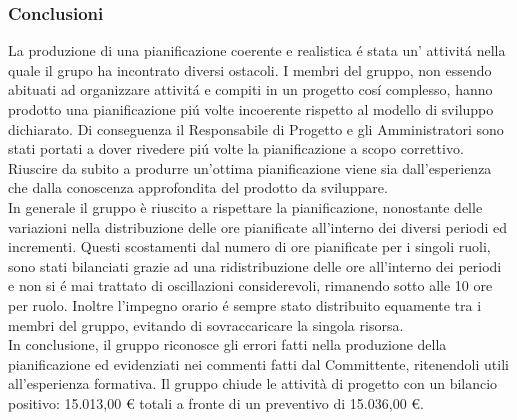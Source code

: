 \subsubsection{Conclusioni}
La produzione di una pianificazione coerente e realistica é stata un' attivitá nella quale il grupo ha incontrato diversi ostacoli. I membri del gruppo, non essendo abituati ad organizzare attivitá e compiti in un progetto cosí complesso, hanno prodotto una pianificazione piú volte incoerente rispetto al modello di sviluppo dichiarato. Di conseguenza il Responsabile di Progetto e gli Amministratori sono stati portati a dover rivedere piú volte la pianificazione a scopo correttivo. Riuscire da subito a produrre un'ottima pianificazione viene sia dall'esperienza che dalla conoscenza approfondita del prodotto da sviluppare.\\
In generale il gruppo è riuscito a rispettare la pianificazione, nonostante delle variazioni nella distribuzione delle ore pianificate all'interno dei diversi periodi ed incrementi. Questi scostamenti dal numero di ore pianificate per i singoli ruoli, sono stati bilanciati grazie ad una ridistribuzione delle ore all'interno dei periodi e non si é mai trattato di oscillazioni considerevoli, rimanendo sotto alle 10 ore per ruolo. Inoltre l'impegno orario é sempre stato distribuito equamente tra i membri del gruppo, evitando di sovraccaricare la singola risorsa.\\
In conclusione, il gruppo riconosce gli errori fatti nella produzione della pianificazione ed evidenziati nei commenti fatti dal Committente, ritenendoli utili all'esperienza formativa. 
\newline
\newline
Il gruppo chiude le attività di progetto con un bilancio positivo: 15.013,00 \euro{} totali a fronte di un preventivo di 15.036,00 \euro{}.
